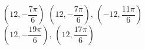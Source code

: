 { $\left( 12, -\dfrac{7\pi}{6} \right)$}
{$\left( 12, -\dfrac{7\pi}{6} \right), \, \left( -12, \dfrac{11\pi}{6} \right)$\\$\left( 12, -\dfrac{19\pi}{6} \right), \, \left( 12, \dfrac{17\pi}{6} \right)$\\ }
